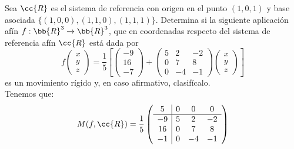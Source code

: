 \begin{ejercicio}
    Sea $\cc{R}$ es el sistema de referencia con origen en el punto $(1, 0, 1)$ y base asociada $\{(1, 0, 0),(1, 1, 0),(1, 1, 1)\}$. Determina si la siguiente aplicación afín $f : \bb{R}^3\to \bb{R}^3$, que en coordenadas respecto del sistema de referencia afín $\cc{R}$ está dada por
    \begin{equation*}
        f\left(\begin{array}{c}
            x \\ y \\ z
        \end{array}\right) = \frac{1}{5}
        \left[
        \left(\begin{array}{c}
            -9 \\ 16 \\ -7
        \end{array}\right) +
        \left(\begin{array}{ccc}
            5 & 2 & -2 \\
            0 & 7 & 8 \\
            0 & -4 & -1
        \end{array}\right)
        \left(\begin{array}{c}
            x \\ y \\ z
        \end{array}\right)
        \right]
    \end{equation*}
    es un movimiento rígido y, en caso afirmativo, clasifícalo.\\

    Tenemos que:
    \begin{equation*}
        M(f, \cc{R}) = \frac{1}{5}\left(
        \begin{array}{c|ccc}
            5 & 0 & 0 & 0 \\ \hline
            -9 & 5 & 2 & -2 \\
            16 & 0 & 7 & 8 \\
            -1 & 0 & -4 & -1
        \end{array}
        \right)
    \end{equation*}


\end{ejercicio}
